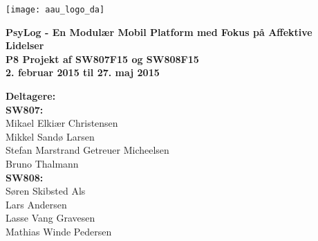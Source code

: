 \hspace*{-1cm}\parbox[b][\textheight][t]{\textwidth}
{

\begin{center}
	\texttt{[image: aau\_logo\_da]}\\
	\vspace{0.25cm}
\end{center} 

\vspace{1cm}
\begin{center}

\textbf{\Huge {PsyLog - En Modulær Mobil Platform med Fokus på Affektive Lidelser}} \\ \vspace{0.5cm}
\textbf{\Large P8 Projekt af SW807F15 og SW808F15}\\ \vspace{0.5cm}
\textbf{\large 2. februar 2015 til 27. maj 2015}\\
\end{center}



\vspace{0.25cm}
\begin{center}
\item {\textbf{Deltagere:}} \\
\textbf{SW807:}\\
Mikael Elkiær Christensen\\
Mikkel Sandø Larsen\\
Stefan Marstrand Getreuer Micheelsen\\
Bruno Thalmann\\[0.2cm]
\textbf{SW808:}\\
Søren Skibsted Als\\
Lars Andersen\\
Lasse Vang Gravesen\\
Mathias Winde Pedersen

\end{center}

\thispagestyle{empty}

\newpage
\thispagestyle{empty}
\mbox{}
}
